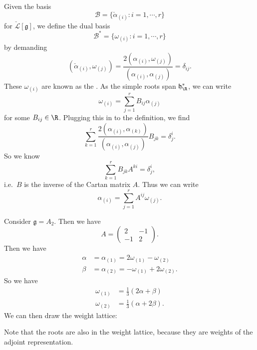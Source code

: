 \documentclass[a4paper]{article}
\begin{document}
Given the basis
\[
  \mathcal{B} = \{\check{\alpha}_{(i)}: i = 1, \cdots, r\}
\]
for $\check{\mathcal{L}}[\mathfrak{g}]$, we define the dual basis
\[
  \mathcal{B}^* = \{\omega_{(i)} : i = 1, \cdots, r\}
\]
by demanding
\[
  (\check{\alpha}_{(i)}, \omega_{(j)}) = \frac{2(\alpha_{(i)}, \omega_{(j)})}{(\alpha_{(i)}, \alpha_{(j)})} = \delta_{ij}.
\]
These $\omega_{(i)}$ are known as the . As the simple roots span $\mathfrak{h}^*_\R$, we can write
\[
  \omega_{(i)} = \sum_{j = 1}^r B_{ij} \alpha_{(j)}
\]
for some $B_{ij} \in \R$. Plugging this in to the definition, we find
\[
  \sum_{k = 1}^r \frac{2(\alpha_{(i)}, \alpha_{(k)})}{(\alpha_{(i)}, \alpha_{(j)})} B_{jk} = \delta^i_j.
\]
So we know
\[
  \sum_{k = 1}^r B_{jk}A^{ki} = \delta^i_j,
\]
i.e.\ $B$ is the inverse of the Cartan matrix $A$. Thus we can write
\[
  \alpha_{(i)} = \sum_{j = 1}^r A^{ij} \omega_{(j)}.
\]
\begin{eg}
  Consider $\mathfrak{g} = A_2$. Then we have
  \[
    A =
    \begin{pmatrix}
      2 & -1\\
      -1 & 2
    \end{pmatrix}.
  \]
  Then we have
  \begin{align*}
    \alpha &= \alpha_{(1)} = 2 \omega_{(1)} - \omega_{(2)}\\
    \beta &= \alpha_{(2)} = - \omega_{(1)} + 2 \omega_{(2)}.
  \end{align*}
  So we have
  \begin{align*}
    \omega_{(1)} &= \frac{1}{3} (2 \alpha + \beta)\\
    \omega_{(2)} &= \frac{1}{3} (\alpha + 2 \beta).
  \end{align*}
  We can then draw the weight lattice:
  \begin{center}
  \end{center}
  Note that the roots are also in the weight lattice, because they are weights of the adjoint representation.
\end{eg}
\end{document}
